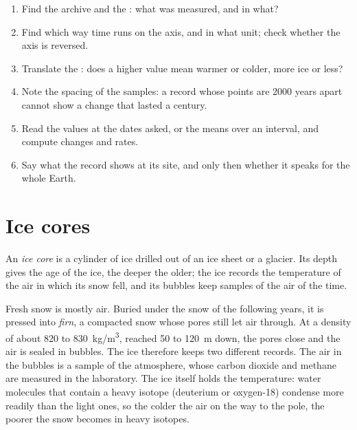 \begin{method}
\begin{enumerate}
  \item Find the archive and the : what was measured, and in what?
  \item Find which way time runs on the axis, and in what unit; check
        whether the  axis is reversed.
  \item Translate the : does a higher value mean warmer or colder,
        more ice or less?
  \item Note the spacing of the samples: a record whose points are
        \num{2000} years apart cannot show a change that lasted a century.
  \item Read the values at the dates asked, or the means over an interval,
        and compute changes and rates.
  \item Say what the record shows at its site, and only then whether it
        speaks for the whole Earth.
\end{enumerate}
\end{method}

\section{Ice cores}

\begin{definition}\label{def:g12:past-climates:ice-core}
An \emph{ice core} is a cylinder of ice drilled out of an ice
sheet or a glacier. Its depth gives the age of the ice, the deeper the older;
the ice records the temperature of the air in which its snow fell, and its
bubbles keep samples of the air of the time.
\end{definition}

Fresh snow is mostly air. Buried under the snow of the following years, it is
pressed into \emph{firn}, a compacted snow whose pores still let air through.
At a density of about 820 to \qty{830}{kg/m^3}, reached 50 to \qty{120}{m}
down, the pores close and the air is sealed in bubbles. The ice therefore keeps two different
records. The air in the bubbles is a sample of the atmosphere, whose carbon
dioxide and methane are measured in the laboratory. The ice itself holds the
temperature: water molecules that contain a heavy isotope (deuterium or
oxygen-18) condense more readily than the light ones, so the colder the air
on the way to the pole, the poorer the snow becomes in heavy isotopes.

